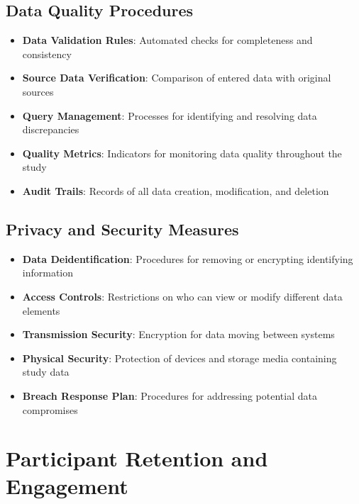 \subsection{Data Quality Procedures}
\begin{itemize}
    \item \textbf{Data Validation Rules}: Automated checks for completeness and consistency
    
    \item \textbf{Source Data Verification}: Comparison of entered data with original sources
    
    \item \textbf{Query Management}: Processes for identifying and resolving data discrepancies
    
    \item \textbf{Quality Metrics}: Indicators for monitoring data quality throughout the study
    
    \item \textbf{Audit Trails}: Records of all data creation, modification, and deletion
\end{itemize}

\subsection{Privacy and Security Measures}
\begin{itemize}
    \item \textbf{Data Deidentification}: Procedures for removing or encrypting identifying information
    
    \item \textbf{Access Controls}: Restrictions on who can view or modify different data elements
    
    \item \textbf{Transmission Security}: Encryption for data moving between systems
    
    \item \textbf{Physical Security}: Protection of devices and storage media containing study data
    
    \item \textbf{Breach Response Plan}: Procedures for addressing potential data compromises
\end{itemize}

\section{Participant Retention and Engagement}
